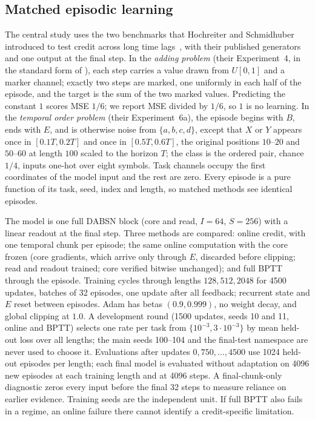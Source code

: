 \documentclass[11pt]{article}
\theoremstyle{definition}
\begin{document}
\subsection{Matched episodic learning}
\label{sec:delayed}

The central study uses the two benchmarks that Hochreiter and Schmidhuber
introduced to test credit across long time lags~\citep{hochreiter1997lstm}, with
their published generators and one output at the final step. In the \emph{adding
problem} (their Experiment~4, in the standard form of
\citealp{arjovsky2016unitary}), each step carries a value drawn from $U[0,1]$ and a
marker channel; exactly two steps are marked, one uniformly in each half of the
episode, and the target is the sum of the two marked values. Predicting the
constant $1$ scores MSE $1/6$; we report MSE divided by $1/6$, so $1$ is no
learning. In the \emph{temporal order problem} (their Experiment~6a), the episode
begins with $B$, ends with $E$, and is otherwise noise from $\{a,b,c,d\}$, except
that $X$ or $Y$ appears once in $[0.1T,0.2T]$ and once in $[0.5T,0.6T]$, the
original positions $10$--$20$ and $50$--$60$ at length $100$ scaled to the horizon
$T$; the class is the ordered pair, chance $1/4$, inputs one-hot over eight
symbols. Task channels occupy the first coordinates of the model input and the
rest are zero. Every episode is a pure function of its task, seed, index and
length, so matched methods see identical episodes.

The model is one full DABSN block (core and read, $I=64$, $S=256$) with a linear
readout at the final step. Three methods are compared: online credit, with one
temporal chunk per episode; the same online computation with the core frozen
(core gradients, which arrive only through $E$, discarded before clipping; read and
readout trained; core verified bitwise unchanged); and full BPTT through the
episode. Training cycles through lengths $128,512,2048$ for 4500 updates, batches
of 32 episodes, one update after all feedback; recurrent state and $E$ reset
between episodes. Adam has betas $(0.9,0.999)$, no weight decay, and global
clipping at $1.0$. A development round (1500 updates, seeds 10 and 11, online and
BPTT) selects one rate per task from $\{10^{-3},3\cdot10^{-3}\}$ by mean held-out
loss over all lengths; the main seeds 100--104 and the final-test namespace are
never used to choose it. Evaluations after updates $0,750,\ldots,4500$ use 1024
held-out episodes per length; each final
model is evaluated without adaptation on 4096 new episodes at each training length
and at 4096 steps. A final-chunk-only diagnostic zeros every input before the final 32
steps to measure reliance on earlier evidence. Training seeds are the
independent unit. If full BPTT also fails in a regime, an online failure there
cannot identify a credit-specific limitation.
\end{document}
